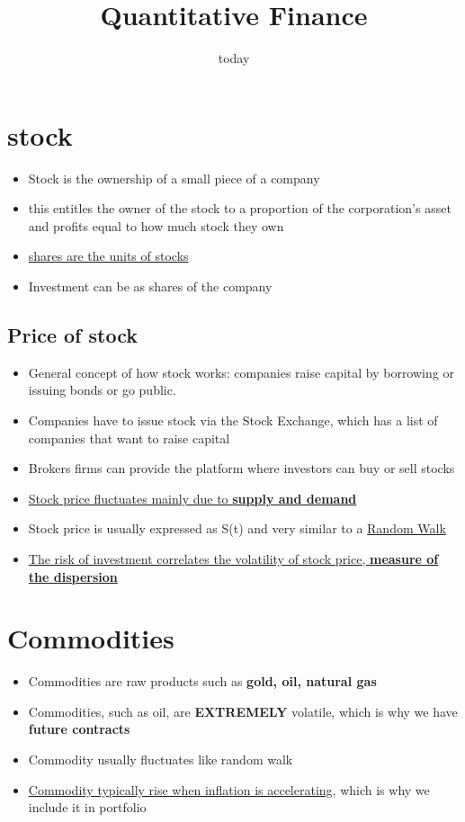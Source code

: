 \documentclass{article}
\title{Quantitative Finance}
\date{today}
\begin{document}
\section{\textbf{stock}}
\begin{itemize}
\item Stock is the ownership of a small piece of a company
\item this entitles the owner of the stock to a proportion of the corporation's asset and profits equal to how much stock they own
\item \underline{shares are the units of stocks}
\item Investment can be as shares of the company
\end{itemize}

\subsection{Price of stock}
\begin{itemize}
\item General concept of how stock works: companies raise capital by borrowing or issuing bonds or go public.
\item Companies have to issue stock via  the Stock Exchange, which has a list of companies that want to raise capital
\item Brokers firms can provide the platform where investors can  buy or sell stocks
\item \underline{Stock price fluctuates mainly due to \textbf{supply and demand}}
\item Stock price is usually expressed as S(t) and very similar to a \underline{Random Walk}
\item \underline{The risk of investment correlates the volatility of stock price, \textbf{measure of the dispersion}}
\end{itemize}

\section{\textbf{Commodities}}
\begin{itemize}
\item Commodities are raw products such as \textbf{gold, oil, natural gas}
\item Commodities, such as oil, are \textbf{EXTREMELY} volatile, which is why we have \textbf{future contracts}
\item Commodity usually fluctuates like random walk
\item \underline{Commodity typically rise when inflation is accelerating}, which is why we include it in portfolio
\end{itemize}
\end{document}
